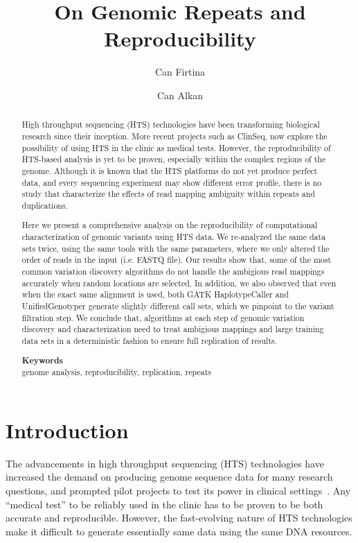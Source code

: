 \documentclass[10pt,a4paper]{article}
\date{}
\def\keywords#1{\begin{center}{\bf Keywords}\\{#1}\end{center}}
\def\titulo#1{\title{#1}}
\begin{document}
\titulo{On Genomic Repeats and Reproducibility}

\author[1]{Can Firtina}
\author[1]{Can Alkan}

\maketitle
\thispagestyle{empty}


\begin{abstract}
High throughput sequencing (HTS) technologies have been transforming biological research since their inception. More recent projects such as ClinSeq, now explore the possibility
of using HTS in the clinic as medical tests. However, the reproducibility of HTS-based analysis is yet to be proven, especially within the complex regions of the genome.
Although it is known that the HTS platforms do not yet produce perfect data, and every sequencing experiment may show different error profile, there is no study that characterize
the effects of read mapping ambiguity within repeats and duplications. 

Here we present a comprehensive analysis on the reproducibility of computational characterization of genomic variants using HTS data. We re-analyzed the same data sets twice, using the same tools with the
same parameters, where we only altered the order of reads in the input (i.e. FASTQ file). Our results show that, some of the most common variation discovery algorithms
do not handle the ambigious read mappings accurately when random locations are selected. In addition, we also observed that even when the exact same alignment is used, both GATK HaplotypeCaller and UnifiedGenotyper generate slightly different call sets, which we pinpoint to the variant filtration step. We conclude that, algorithms at each step of genomic variation
discovery and characterization need to treat ambigious mappings and large training data sets in a deterministic fashion to ensure full replication of results.

\keywords{genome analysis, reproducibility, replication, repeats}
\end{abstract}

\section{Introduction}
The advancements in high throughput sequencing (HTS) technologies have increased the demand on producing genome sequence data for many research questions, and prompted pilot projects to test its
power in clinical settings~\cite{Biesecker2009}. Any ``medical test'' to be reliably used in the clinic has to be proven to be both accurate and reproducible.
However, the fast-evolving nature of HTS technologies make it difficult to generate essentially same data using the same DNA resources. 
\end{document}
